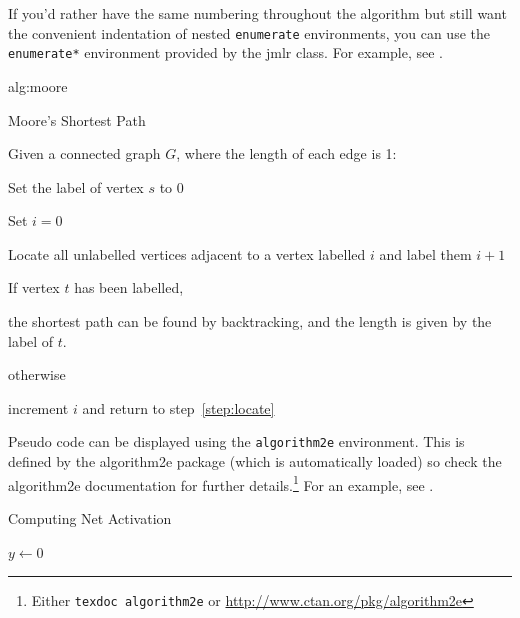 \documentclass[pmlr]{jmlr}%
\begin{document}
If you'd rather have the same numbering throughout the algorithm
but still want the convenient indentation of nested 
\texttt{enumerate} environments, you can use the
\texttt{enumerate*} environment provided by the \textsf{jmlr}
class. For example, see .

\begin{algorithm}
\floatconts
{alg:moore}%
{\caption{Moore's Shortest Path}}%
{%
Given a connected graph $G$, where the length of each edge is 1:
\begin{enumerate*}
  \item Set the label of vertex $s$ to 0
  \item Set $i=0$
  \begin{enumerate*}
    \item \label{step:locate}Locate all unlabelled vertices 
          adjacent to a vertex labelled $i$ and label them $i+1$
    \item If vertex $t$ has been labelled,
    \begin{enumerate*}
      \item[] the shortest path can be found by backtracking, and 
      the length is given by the label of $t$.
    \end{enumerate*}
    otherwise
    \begin{enumerate*}
      \item[] increment $i$ and return to step~\ref{step:locate}
    \end{enumerate*}
  \end{enumerate*}
\end{enumerate*}
}
\end{algorithm}

Pseudo code can be displayed using the \texttt{algorithm2e}
environment. This is defined by the \textsf{algorithm2e} package
(which is automatically loaded) so check the \textsf{algorithm2e}
documentation for further details.\footnote{Either \texttt{texdoc
algorithm2e} or \url{http://www.ctan.org/pkg/algorithm2e}}
For an example, see .

\begin{algorithm2e}
\caption{Computing Net Activation}
\label{alg:net}
{}
$y\leftarrow 0$\;
\end{algorithm2e}
\end{document}
